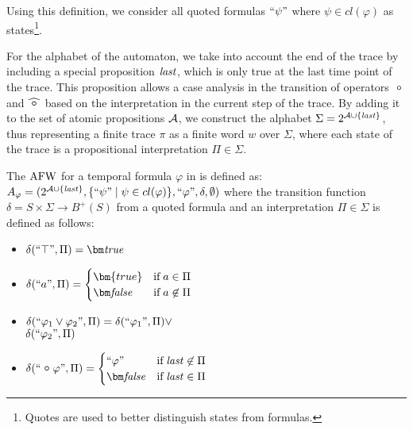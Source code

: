 Using this definition, we consider all quoted formulas $``\psi"$ where $\psi \in cl(\varphi)$  as states\footnote{Quotes are used to better distinguish states from formulas.}.

For the alphabet of the automaton, we take into account the end of the trace by including a special proposition $\mathit{last}$, which is only true at the last time point of the trace. This proposition allows a case analysis in the transition of operators $\Next$ and $\wnext$ based on the interpretation in the current step of the trace. By adding it to the set of atomic propositions $\mathcal{A }$, we construct the alphabet $\Sigma=2^{\mathcal{A } \cup \{\mathit{last}\}}$, thus representing a finite trace $\pi$ as a finite word $w$ over $\Sigma$, where each state of the trace is a propositional interpretation $\Pi \in \Sigma$.

\begin{definition}
    The $\mathrm{AFW}$ for a temporal formula $\varphi$ in \nnf is defined as:
    $A_\varphi =(2^{\mathcal{A } \cup \{\mathit{last}\}},\{``\psi" \mid \psi \in cl(\varphi) \},``\varphi",\delta,\emptyset)$ where the transition function $\delta = S\times \Sigma \to B^+(S)$ from a quoted formula and an interpretation $\Pi\in\Sigma$ is defined as follows: 


\begin{multicols}{2}
    \begin{itemize}
        \item $\delta(``\top",\Pi)= \mathit{\tpbf}$

        \item $\delta(``a",\Pi)=\begin{cases}
          \bm{true} & \text{if} \;a\in \Pi \\
          \fpbf & \text{if} \;a\not\in \Pi \\
        \end{cases}$
        
        \item $\delta(``\varphi_1 \vee \varphi_2",\Pi)=\delta(``\varphi_1",\Pi) \vee $\\\phantom{$\delta(``\varphi_1 \vee \varphi_2\;",\Pi)= $}$\delta(``\varphi_2",\Pi)$

        
        \item $\delta(``\Next \varphi",\Pi)=\begin{cases}
          ``\varphi" & \text{if} \;\last\not\in \Pi \\
          \fpbf & \text{if} \;\last\in \Pi \\
        \end{cases}$
        

\end{itemize}
\end{multicols}
\end{definition}
